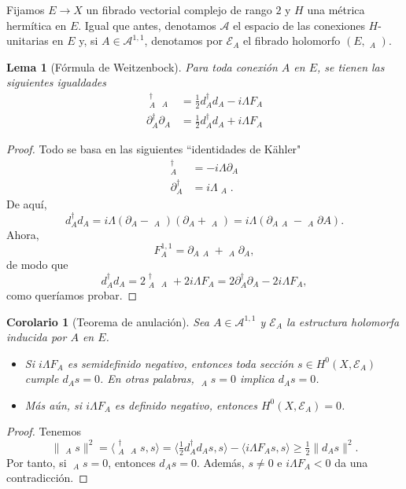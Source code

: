 \documentclass[12pt, a4paper]{amsart}
\newcommand\Aa{\mathcal{A}}
\newcommand\EE{\mathscr{E}}
\DeclareMathOperator\delbar{\bar{\partial}}
\newtheorem{lema}[thm]{Lema}
\newtheorem{corol}[thm]{Corolario}
\theoremstyle{remark} \newtheorem{rmk}[thm]{Observación}
\theoremstyle{remark} \newtheorem{rmks}[thm]{Observaciones}
\theoremstyle{definition} \newtheorem{defn}[thm]{Definición}
\theoremstyle{definition} \newtheorem{ejs}[thm]{Ejemplos}
\theoremstyle{definition} \newtheorem{ej}[thm]{Ejemplo}
\begin{document}
Fijamos $E\rightarrow X$ un fibrado vectorial complejo de rango $2$ y $H$ una métrica hermítica en $E$. Igual que antes, denotamos $\Aa$ el espacio de las conexiones $H$-unitarias en $E$ y, si $A\in \Aa^{1,1}$, denotamos por $\EE_A$ el fibrado holomorfo $(E,\delbar_A)$.

\begin{lema}[Fórmula de Weitzenbock]
	Para toda conexión $A$ en $E$, se tienen las siguientes igualdades
	 \begin{align*}
		 \delbar_A^\dagger \delbar_A &= \tfrac{1}{2} d_A^\dagger d_A - i \Lambda F_A \\
		 \partial_A^\dagger \partial_A &= \tfrac{1}{2} d_A^\dagger d_A + i \Lambda F_A
	\end{align*}
\end{lema}
\begin{proof}
Todo se basa en las siguientes ``identidades de Kähler" 	
\begin{align*}
	\delbar_A^\dagger &= -i \Lambda \partial_A \\
	\partial_A^\dagger &= i \Lambda \delbar_A.
\end{align*}
De aquí,
\begin{equation*}
	d_A^\dagger d_A = i \Lambda(\partial_A - \delbar_A)(\partial_A + \delbar_A) = i\Lambda(\partial_A \delbar_A - \delbar_A \partial A).
\end{equation*} 
Ahora,
\begin{equation*}
F_A^{1,1}= \partial_A \delbar_A + \delbar_A \partial_A,
\end{equation*} 
de modo que
\begin{equation*}
d_A^\dagger d_A = 2\delbar_A^\dagger \delbar_A + 2i\Lambda F_A = 2\partial_A^\dagger \partial_A - 2i\Lambda F_A,
\end{equation*} 
como queríamos probar.
\end{proof}

\begin{corol}[Teorema de anulación]
	Sea $A\in \Aa^{1,1}$ y $\EE_A$ la estructura holomorfa inducida por $A$ en $E$.
	\begin{itemize}
		\item Si $i\Lambda F_A$ es semidefinido negativo, entonces toda sección  $s\in H^0(X,\EE_A)$ cumple $d_A s=0$. En otras palabras,  $\delbar_A s=0$ implica $d_A s =0$.
		\item Más aún, si  $i\Lambda F_A$ es definido negativo, entonces $H^0(X,\EE_A)=0$.
	\end{itemize}
	
\end{corol}
\begin{proof}
	Tenemos
	\begin{equation*}
		\lVert \delbar_A s\rVert^2 = \langle \delbar_A^\dagger \delbar_A s, s\rangle = \langle \tfrac{1}{2} d_A^\dagger d_A s, s \rangle - \langle i \Lambda F_A s, s \rangle \geq \tfrac{1}{2}\lVert d_A s\rVert^2.
	\end{equation*} 
	Por tanto, si $\delbar_A s=0$, entonces  $d_A s=0$. Además, $s\neq 0$ e  $i\Lambda F_A <0$ da una contradicción.
\end{proof}
\end{document}
